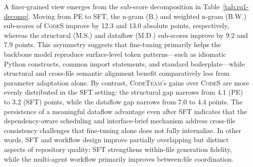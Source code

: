 \documentclass[format=acmsmall, review=false, screen=true]{acmart}
\newcommand{\tool}{\textsc{CodeTeam}\xspace}
\newcommand{\codes}{\textsc{CodeS}\xspace}
\begin{document}
A finer-grained view emerges from the sub-score decomposition in Table~\ref{tab:rq1-decomp}.
Moving from PE to SFT, the n-gram (B.) and weighted n-gram (B.W.) sub-scores of \codes improve by 12.3 and 13.0 absolute points, respectively, whereas the structural (M.S.) and dataflow (M.D.) sub-scores improve by 9.2 and 7.9 points.
This asymmetry suggests that fine-tuning primarily helps the backbone model reproduce surface-level token patterns---such as idiomatic Python constructs, common import statements, and standard boilerplate---while structural and cross-file semantic alignment benefit comparatively less from parameter adaptation alone.
By contrast, \tool's gains over \codes are more evenly distributed in the SFT setting: the structural gap narrows from 4.1 (PE) to 3.2 (SFT) points, while the dataflow gap narrows from 7.0 to 4.4 points.
The persistence of a meaningful dataflow advantage even after SFT indicates that the dependency-aware scheduling and interface-brief mechanism address cross-file consistency challenges that fine-tuning alone does not fully internalize.
In other words, SFT and workflow design improve partially overlapping but distinct aspects of repository quality: SFT strengthens within-file generation fidelity, while the multi-agent workflow primarily improves between-file coordination.
\end{document}

